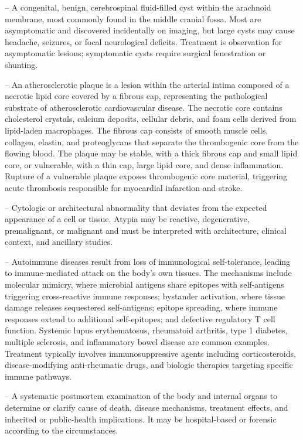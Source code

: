-- A congenital, benign, cerebrospinal fluid-filled cyst within the arachnoid membrane, most commonly found in the middle cranial fossa. Most are asymptomatic and discovered incidentally on imaging, but large cysts may cause headache, seizures, or focal neurological deficits. Treatment is observation for asymptomatic lesions; symptomatic cysts require surgical fenestration or shunting.

-- An atherosclerotic plaque is a lesion within the arterial intima composed of a necrotic lipid core covered by a fibrous cap, representing the pathological substrate of atherosclerotic cardiovascular disease. The necrotic core contains cholesterol crystals, calcium deposits, cellular debris, and foam cells derived from lipid-laden macrophages. The fibrous cap consists of smooth muscle cells, collagen, elastin, and proteoglycans that separate the thrombogenic core from the flowing blood. The plaque may be stable, with a thick fibrous cap and small lipid core, or vulnerable, with a thin cap, large lipid core, and dense inflammation. Rupture of a vulnerable plaque exposes thrombogenic core material, triggering acute thrombosis responsible for myocardial infarction and stroke.

-- Cytologic or architectural abnormality that deviates from the expected appearance of a cell or tissue. Atypia may be reactive, degenerative, premalignant, or malignant and must be interpreted with architecture, clinical context, and ancillary studies.

-- Autoimmune diseases result from loss of immunological self-tolerance, leading to immune-mediated attack on the body's own tissues. The mechanisms include molecular mimicry, where microbial antigens share epitopes with self-antigens triggering cross-reactive immune responses; bystander activation, where tissue damage releases sequestered self-antigens; epitope spreading, where immune responses extend to additional self-epitopes; and defective regulatory T cell function. Systemic lupus erythematosus, rheumatoid arthritis, type 1 diabetes, multiple sclerosis, and inflammatory bowel disease are common examples. Treatment typically involves immunosuppressive agents including corticosteroids, disease-modifying anti-rheumatic drugs, and biologic therapies targeting specific immune pathways.

-- A systematic postmortem examination of the body and internal organs to determine or clarify cause of death, disease mechanisms, treatment effects, and inherited or public-health implications. It may be hospital-based or forensic according to the circumstances.

